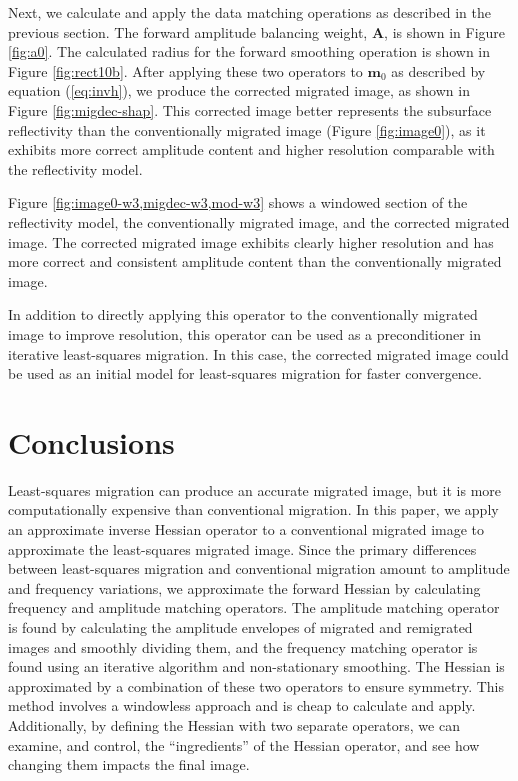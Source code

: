 
    Next, we calculate and apply the data matching operations as described in the previous section. 
    The forward amplitude balancing weight, $\mathbf{A}$, is shown in Figure \ref{fig:a0}.
    The calculated radius for the forward smoothing operation is shown in Figure \ref{fig:rect10b}.
    After applying these two operators to $\mathbf{m}_0$ as described by equation (\ref{eq:invh}), we produce the corrected migrated image, as shown in Figure \ref{fig:migdec-shap}.
    This corrected image better represents the subsurface reflectivity than the conventionally migrated image (Figure \ref{fig:image0}), as it exhibits more correct amplitude content and higher resolution comparable with the reflectivity model.


    Figure \ref{fig:image0-w3,migdec-w3,mod-w3} shows a windowed section of the reflectivity model, the conventionally migrated image, and the corrected migrated image.
    The corrected migrated image exhibits clearly higher resolution and has more correct and consistent amplitude content than the conventionally migrated image.

    In addition to directly applying this operator to the conventionally migrated image to improve resolution, this operator can be used as a preconditioner in iterative least-squares migration.
    In this case, the corrected migrated image could be used as an initial model for least-squares migration for faster convergence.

\section{Conclusions}
    Least-squares migration can produce an accurate migrated image, but it is more computationally expensive than conventional migration.
    In this paper, we apply an approximate inverse Hessian operator to a conventional migrated image to approximate the least-squares migrated image.
    Since the primary differences between least-squares migration and conventional migration amount to amplitude and frequency variations, we approximate the forward Hessian by calculating frequency and amplitude matching operators.
    The amplitude matching operator is found by calculating the amplitude envelopes of migrated and remigrated images and smoothly dividing them, and the frequency matching operator is found using an iterative algorithm and non-stationary smoothing.
    The Hessian is approximated by a combination of these two operators to ensure symmetry.
    This method involves a windowless approach and is cheap to calculate and apply.
    Additionally, by defining the Hessian with two separate operators, we can examine, and control, the ``ingredients'' of the Hessian operator, and see how changing them impacts the final image.

